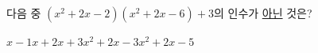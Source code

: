 다음 중 $(x^2+2x-2)(x^2+2x-6)+3$의 인수가 \underline{아닌} 것은?
\begin{choices32}{$x-1$}{$x+2$}{$x+3$}{$x^2+2x-3$}{$x^2+2x-5$}\end{choices32}
